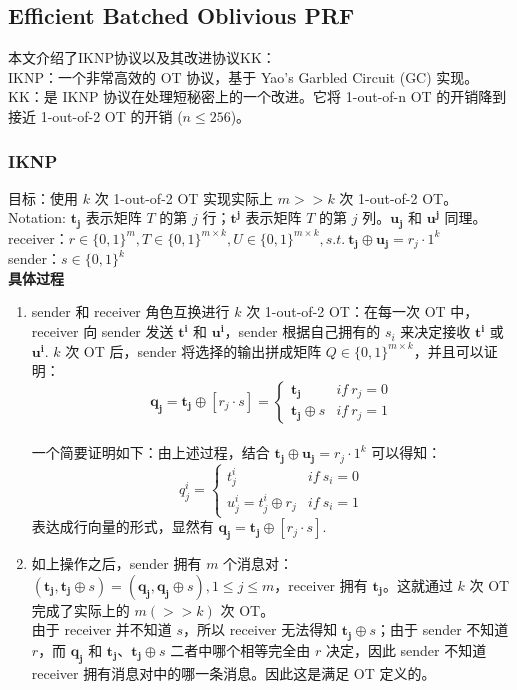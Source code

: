 \subsection{ Efficient Batched Oblivious PRF }
\noindent 本文介绍了IKNP协议\cite{ishai2003extending}以及其改进协议KK\cite{kolesnikov2013improved}：\\
IKNP\cite{ishai2003extending}：一个非常高效的 OT 协议，基于 Yao’s Garbled Circuit (GC) 实现。\\
KK\cite{kolesnikov2013improved}：是 IKNP 协议在处理短秘密上的一个改进。它将 1-out-of-n OT 的开销降到接近 1-out-of-2 OT 的开销 ($n\le 256$)。
\subsubsection{IKNP\cite{ishai2003extending}}
\noindent 目标：使用 $k$ 次 1-out-of-2 OT 实现实际上 $m>>k$ 次 1-out-of-2 OT。\\
Notation: $\boldsymbol{t_j}$ 表示矩阵 $T$ 的第 $j$ 行；$\boldsymbol{t^j}$ 表示矩阵 $T$ 的第 $j$ 列。$\boldsymbol{u_j}$ 和 $\boldsymbol{u^j}$ 同理。\\
receiver：$r\in\{0,1\}^m, T\in\{0,1\}^{m\times k}, U\in\{0,1\}^{m\times k}, s.t.\  \boldsymbol{t_j}\oplus\boldsymbol{u_j}=r_j\cdot 1^k$\\
sender：$ s\in \{0,1\}^k $ \\
\textbf{具体过程}
\begin{enumerate}
 \item  sender 和 receiver 角色互换进行 $k$ 次 1-out-of-2 OT：在每一次 OT 中，receiver 向 sender 发送 $\boldsymbol{t^i}$ 和 $\boldsymbol{u^i}$，sender 根据自己拥有的 $s_i$ 来决定接收 $\boldsymbol{t^i}$ 或 $\boldsymbol{u^i}$. $k$ 次 OT 后，sender 将选择的输出拼成矩阵 $Q\in \{0,1\}^{m\times k}$，并且可以证明： 
  $$ \boldsymbol{q_ {j}}  =  \boldsymbol{t_ {j}}  \oplus [r_ {j}\cdot s ] =  \begin{cases}\boldsymbol{t_ {j}} &if~ r_{j}=0\\\boldsymbol{t_ {j}}\oplus s &if~ r_j=1\end{cases} $$\\
      一个简要证明如下：由上述过程，结合 $\boldsymbol{t_j}\oplus\boldsymbol{u_j}=r_j\cdot 1^k$ 可以得知：
     $$ q_j^i = \begin{cases}t_j^i &if~ s_{i}=0\\u_j^i=t_j^i\oplus r_j &if~ s_i=1\end{cases} $$
     表达成行向量的形式，显然有 $\boldsymbol{q_ {j}}  =  \boldsymbol{t_ {j}}  \oplus [r_ {j}\cdot s ]$.
  \item  如上操作之后，sender 拥有 $m$ 个消息对：\\$(\boldsymbol{t_j},\boldsymbol{t_j}\oplus s)=(\boldsymbol{q_j},\boldsymbol{q_j}\oplus s), 1\le j\le m$，receiver 拥有 $\boldsymbol{t_j}$。这就通过 $k$ 次 OT 完成了实际上的 $m(>>k)$ 次 OT。\\
     由于 receiver 并不知道 $s$，所以 receiver 无法得知 $\boldsymbol{t_j}\oplus s$；由于 sender 不知道 $r$，而 $\boldsymbol{q_j}$ 和 $\boldsymbol{t_j}$、$\boldsymbol{t_j}\oplus s$ 二者中哪个相等完全由 $r$ 决定，因此 sender 不知道 receiver 拥有消息对中的哪一条消息。因此这是满足 OT 定义的。
    \end{enumerate}
